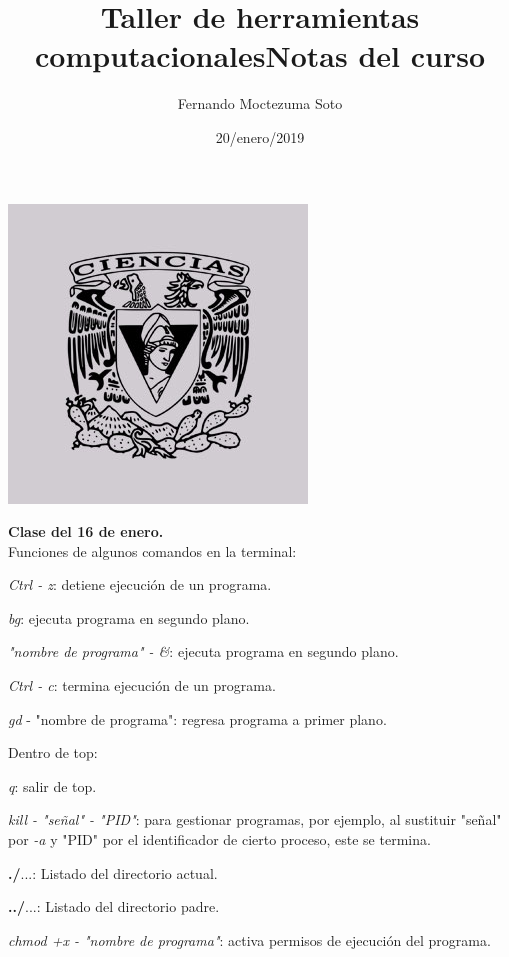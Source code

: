 \documentclass[etterpaper, 12pt, oneside]{article}%
\title{\Huge Taller de herramientas computacionales}
\author{Fernando Moctezuma Soto}
\date{20/enero/2019}
\begin{document}
	\maketitle
	
	\begin{center}
		\includegraphics[scale=0.40]{1.jpg}
	\end{center}
	
	\newpage
	
	\title{\Huge Notas del curso\\}
	
	\textbf{Clase del 16 de enero.}\\
	
	
	Funciones de algunos comandos en la terminal:
	
	\emph{Ctrl - z}: detiene ejecución de un programa.
	
	\emph{bg}: ejecuta programa en segundo plano.
	
	\emph{"nombre de programa" - \&}: ejecuta programa en segundo plano.
	
	\emph{Ctrl - c}: termina ejecución de un programa.
	
	\emph{gd} - "nombre de programa": regresa programa a primer plano.
	
	Dentro de top:
	
	\emph q: salir de top.
	
	\emph{kill - "señal" - "PID"}: para gestionar programas, por ejemplo, al sustituir "señal" por \emph{-a} y "PID" por el identificador de cierto proceso, este se termina.
	
	\textbf{./}...: Listado del directorio actual.
	
	\textbf{../}...: Listado del directorio padre.
	
	\emph{chmod +x - "nombre de programa"}: activa permisos de ejecución del programa.
	
\end{document}
